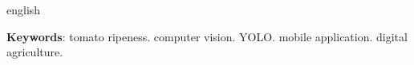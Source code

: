 \begin{resumo}[Abstract]
\begin{otherlanguage*}{english}

\vspace{\onelineskip}

\noindent
\textbf{Keywords}: tomato ripeness. computer vision. YOLO. mobile application. digital agriculture.
\end{otherlanguage*}
\end{resumo}
